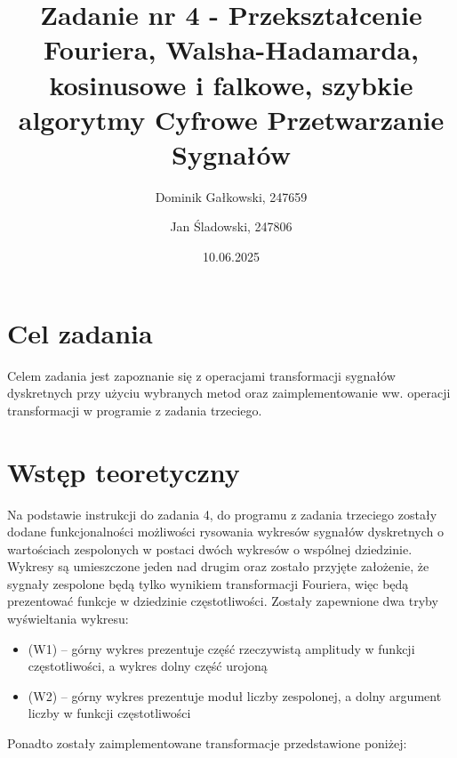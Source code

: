 \documentclass{article}
\title{{\bf Zadanie nr 4 - Przekształcenie Fouriera, Walsha-Hadamarda,
kosinusowe i falkowe, szybkie algorytmy}\linebreak
Cyfrowe Przetwarzanie Sygnałów}
\author{Dominik Gałkowski, 247659 \and Jan Śladowski, 247806}
\date{10.06.2025}
\begin{document}
\clearpage\maketitle
\thispagestyle{empty}
\newpage
\setcounter{page}{1}
\section{Cel zadania}
    Celem zadania jest zapoznanie się z operacjami transformacji sygnałów dyskretnych
    przy użyciu wybranych metod oraz zaimplementowanie ww. operacji transformacji
    w programie z zadania trzeciego.
\section{Wstęp teoretyczny}

Na podstawie instrukcji do zadania 4,
        do programu z zadania trzeciego zostały dodane funkcjonalności
        możliwości rysowania wykresów sygnałów dyskretnych o
        wartościach zespolonych w postaci dwóch wykresów o wspólnej
        dziedzinie. Wykresy są umieszczone jeden nad drugim oraz
        zostało przyjęte założenie, że sygnały zespolone będą tylko
        wynikiem transformacji Fouriera, więc będą prezentować funkcje
        w dziedzinie częstotliwości.
        Zostały zapewnione dwa tryby wyświeltania wykresu:
        \begin{itemize}
            \item (W1) – górny wykres prezentuje część rzeczywistą
                amplitudy w funkcji częstotliwości, a wykres dolny
                część urojoną
            \item (W2) – górny wykres prezentuje moduł liczby
                zespolonej, a dolny argument liczby w funkcji
                częstotliwości
        \end{itemize}
        Ponadto zostały zaimplementowane transformacje przedstawione
        poniżej: 
\end{document}
